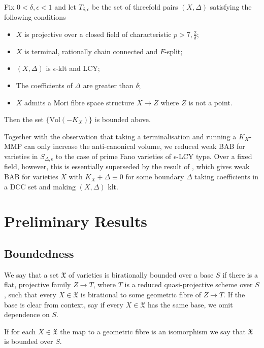 \documentclass[a4paper,12pt]{book}
\newcommand{\D}{\Delta}
\newcommand{\Vol}{\text{Vol}}
\begin{document}
	\begin{theorem}\label{Main2}
		Fix $0 < \delta, \epsilon <1$ and let $T_{\delta,\epsilon}$ be the set of threefold pairs $(X,\Delta)$ satisfying the following conditions
		\begin{itemize}
			\item $X$ is projective over a closed field of characteristic $p >7,\frac{2}{\delta}$;
			 \item $X$ is terminal, rationally chain connected and $F$-split;
			\item $(X,\Delta)$ is $\epsilon$-klt and LCY;
			\item The coefficients of $\Delta$ are greater than $\delta$;
			\item $X$ admits a Mori fibre space structure $X \to Z$ where $Z$ is not a point.
		\end{itemize}
	Then the set $\{\Vol(-K_{X})\}$ is bounded above. 
	\end{theorem}
	\begin{remark}
		Together with the observation that taking a terminalisation and running a $K_{X}$-MMP can only increase the anti-canonical volume, we reduced weak BAB for varieties in $S_{\D,\epsilon}$ to the case of prime Fano varieties of $\epsilon$-LCY type. Over a fixed field, however, this is essentially superseded by the result of \cite{das2018boundedness}, which gives weak BAB for varieties $X$ with $K_{X}+\D \equiv 0$ for some boundary $\D$ taking coefficients in a DCC set and making $(X,\D)$ klt. 
	\end{remark}

	


\section{Preliminary Results}

\subsection{Boundedness}

\begin{definition}\label{d_birationally-bounded} We say that a set $\mathfrak{X}$ 
	of varieties is birationally bounded over a base $S$ if there is a flat, projective family $Z \to T$, where $T$ is a reduced quasi-projective scheme over $S$, such that every $X\in \mathfrak{X}$ is birational to some geometric fibre of $Z \to T$. If the base is clear from context, say if every $X \in \mathfrak{X}$ has the same base, we omit dependence on $S$.
	
	If for each $X \in \mathfrak{X}$ the map to a geometric fibre is an isomorphism we say that $\mathfrak{X}$ is bounded over $S$.
\end{definition}
\end{document}
